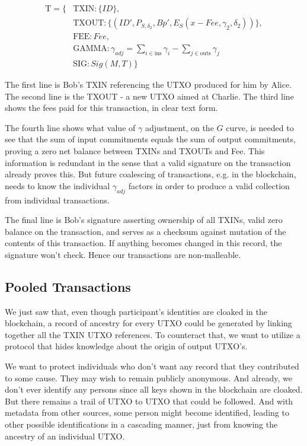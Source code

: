 \documentclass[a4paper, 10pt, conference]{ieeeconf}
\begin{document}
\begin{align*}
\text{T} = \{&\text{TXIN} : \{\mathit{ID}\}, \\
 &\text{TXOUT} : \{(\mathit{ID'}, P_{S, \delta_2}, \mathit{Bp'}, E_S(x - \mathit{Fee}, \gamma_2, \delta_2))\}, \\
 &\text{FEE} : \mathit{Fee}, \\
 &\text{GAMMA} : \gamma_{\mathit{adj}} = \sum_{i \in \text{ins}}{\gamma_i} - \sum_{j \in \text{outs}}{\gamma_j}\\
 &\text{SIG} : \mathit{Sig}(M, T)\}
\end{align*}

The first line is Bob's TXIN referencing the UTXO produced for him by Alice. The second line is the TXOUT - a new UTXO aimed at Charlie. The third line shows the fees paid for this transaction, in clear text form. 

The fourth line shows what value of $\gamma$ adjustment, on the $G$ curve, is needed to see that the sum of input commitments equals the sum of output commitments, proving a zero net balance between TXINs and TXOUTs and Fee. This information is redundant in the sense that a valid signature on the transaction already proves this. But future coalescing of transactions, e.g. in the blockchain, needs to know the individual $\gamma_{\mathit{adj}}$ factors in order to produce a valid collection from individual transactions.

The final line is Bob's signature asserting ownership of all TXINs, valid zero balance on the transaction, and serves as a checksum against mutation of the contents of this transaction. If anything becomes changed in this record, the signature won't check. Hence our transactions are non-malleable.

\subsection{Pooled Transactions}
We just saw that, even though participant's identities are cloaked in the blockchain, a record of ancestry for every UTXO could be generated by linking together all the TXIN UTXO references. To counteract that, we want to utilize a protocol that hides knowledge about the origin of output UTXO's.

We want to protect individuals who don't want any record that they contributed to some cause. They may wish to remain publicly anonymous. And already, we don't ever identify any persons since all keys shown in the blockchain are cloaked. But there remains a trail of UTXO to UTXO that could be followed. And with metadata from other sources, some person might become identified, leading to other possible identifications in a cascading manner, just from knowing the ancestry of an individual UTXO.
\end{document}
